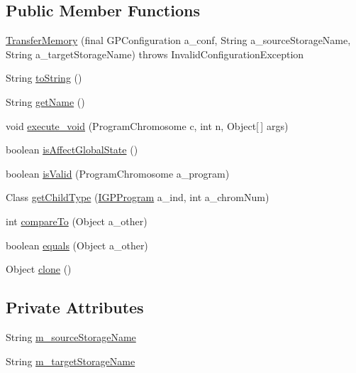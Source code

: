\subsection*{Public Member Functions}
\begin{DoxyCompactItemize}
\item 
\hyperlink{classorg_1_1jgap_1_1gp_1_1function_1_1_transfer_memory_a44ab9014aa4b51c2862b930f961dbceb}{Transfer\-Memory} (final G\-P\-Configuration a\-\_\-conf, String a\-\_\-source\-Storage\-Name, String a\-\_\-target\-Storage\-Name)  throws Invalid\-Configuration\-Exception 
\item 
String \hyperlink{classorg_1_1jgap_1_1gp_1_1function_1_1_transfer_memory_a61d53c28b323362535b231a916fd9b68}{to\-String} ()
\item 
String \hyperlink{classorg_1_1jgap_1_1gp_1_1function_1_1_transfer_memory_a45fac1ce6620c894d7f0976668e5d35d}{get\-Name} ()
\item 
void \hyperlink{classorg_1_1jgap_1_1gp_1_1function_1_1_transfer_memory_aed8e8279825e4abef772572e6afbc21e}{execute\-\_\-void} (Program\-Chromosome c, int n, Object\mbox{[}$\,$\mbox{]} args)
\item 
boolean \hyperlink{classorg_1_1jgap_1_1gp_1_1function_1_1_transfer_memory_a3eb497c878c705b6a8006d87b5d1db70}{is\-Affect\-Global\-State} ()
\item 
boolean \hyperlink{classorg_1_1jgap_1_1gp_1_1function_1_1_transfer_memory_a6aab6e1ea1f5a8132ad515f5006761f8}{is\-Valid} (Program\-Chromosome a\-\_\-program)
\item 
Class \hyperlink{classorg_1_1jgap_1_1gp_1_1function_1_1_transfer_memory_a41f1de61e029e862078dffdc2eba1858}{get\-Child\-Type} (\hyperlink{interfaceorg_1_1jgap_1_1gp_1_1_i_g_p_program}{I\-G\-P\-Program} a\-\_\-ind, int a\-\_\-chrom\-Num)
\item 
int \hyperlink{classorg_1_1jgap_1_1gp_1_1function_1_1_transfer_memory_a1d484fcd2837d97d972b71c980844ec0}{compare\-To} (Object a\-\_\-other)
\item 
boolean \hyperlink{classorg_1_1jgap_1_1gp_1_1function_1_1_transfer_memory_a3f15762848d48c0b78e7eed786d87078}{equals} (Object a\-\_\-other)
\item 
Object \hyperlink{classorg_1_1jgap_1_1gp_1_1function_1_1_transfer_memory_a639b07721344a9bbb7de12f172a44a01}{clone} ()
\end{DoxyCompactItemize}
\subsection*{Private Attributes}
\begin{DoxyCompactItemize}
\item 
String \hyperlink{classorg_1_1jgap_1_1gp_1_1function_1_1_transfer_memory_ab71c4cbe9188be6de47440940b82658f}{m\-\_\-source\-Storage\-Name}
\item 
String \hyperlink{classorg_1_1jgap_1_1gp_1_1function_1_1_transfer_memory_aecf90e862244c4474eaf55194eba8802}{m\-\_\-target\-Storage\-Name}
\end{DoxyCompactItemize}
